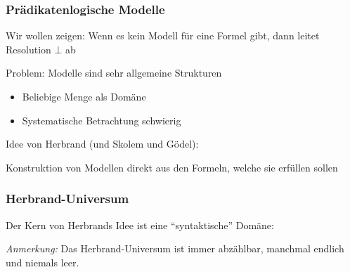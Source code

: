 \documentclass[aspectratio=1610,onlymath]{beamer}
\begin{document}
\begin{frame}\frametitle{Prädikatenlogische Modelle}

Wir wollen zeigen: Wenn es kein Modell für eine Formel gibt, dann leitet Resolution $\bot$ ab\bigskip

\alert{Problem:} Modelle sind sehr allgemeine Strukturen
\begin{itemize}
\item Beliebige Menge als Domäne
\item Systematische Betrachtung schwierig
\end{itemize}\bigskip\pause

\alert{Idee von Herbrand (und Skolem und Gödel)}:
\begin{center}
{\Large{}}\medskip

Konstruktion von Modellen direkt aus den Formeln, welche sie erfüllen sollen
\end{center}

\end{frame}

\begin{frame}\frametitle{Herbrand-Universum}

Der Kern von Herbrands Idee ist eine "`syntaktische"' Domäne:\medskip


\emph{Anmerkung:} Das Herbrand-Universum ist immer abzählbar, manchmal endlich und niemals leer.\pause


\end{frame}
\end{document}
